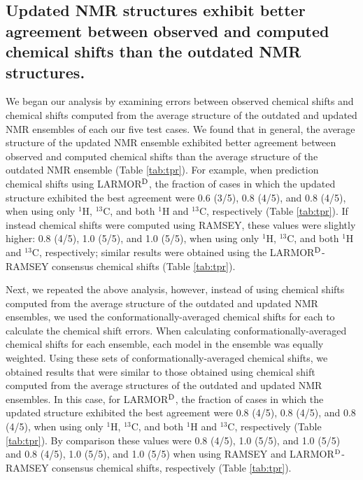 \documentclass[fleqn,10pt]{wlscirep}
\begin{document}
\subsection*{Updated NMR structures exhibit better agreement between observed and computed chemical shifts than the outdated NMR structures.} 

We began our analysis by examining errors between observed chemical shifts and chemical shifts computed from the average structure of the outdated and updated NMR ensembles of each our five test cases. We found that in general, the average structure of the updated NMR ensemble exhibited better agreement between observed and computed chemical shifts than the average structure of the outdated NMR ensemble (Table \ref{tab:tpr}). For example, when prediction chemical shifts using LARMOR$^{\rm D}$, the fraction of cases in which the updated structure exhibited the best agreement were 0.6 (3/5), 0.8 (4/5), and 0.8 (4/5), when using only $^{1}$H, $^{13}$C, and both $^{1}$H and $^{13}$C, respectively (Table \ref{tab:tpr}). If instead chemical shifts were computed using RAMSEY, these values were slightly higher:  0.8 (4/5), 1.0 (5/5), and 1.0 (5/5), when using only $^{1}$H, $^{13}$C, and both $^{1}$H and $^{13}$C, respectively; similar results  were obtained using the LARMOR$^{\rm D}$-RAMSEY consensus chemical shifts (Table \ref{tab:tpr}).


Next, we repeated the above analysis, however, instead of using chemical shifts computed from the average structure of the outdated and updated NMR ensembles, we used the conformationally-averaged chemical shifts for each to calculate the chemical shift errors. When calculating conformationally-averaged chemical shifts for each ensemble, each model in the ensemble was equally weighted. Using these sets of conformationally-averaged chemical shifts, we obtained results that were similar to those obtained using chemical shift computed from the average structures of the outdated and updated NMR ensembles. In this case, for LARMOR$^{\rm D}$, the fraction of cases in which the updated structure exhibited the best agreement were 0.8 (4/5), 0.8 (4/5), and 0.8 (4/5), when using only $^{1}$H, $^{13}$C, and both $^{1}$H and $^{13}$C, respectively (Table \ref{tab:tpr}). By comparison these values were  0.8 (4/5), 1.0 (5/5), and 1.0 (5/5)  and 0.8 (4/5), 1.0 (5/5), and 1.0 (5/5) when using RAMSEY and LARMOR$^{\rm D}$-RAMSEY consensus chemical shifts, respectively (Table \ref{tab:tpr}).
\end{document}

